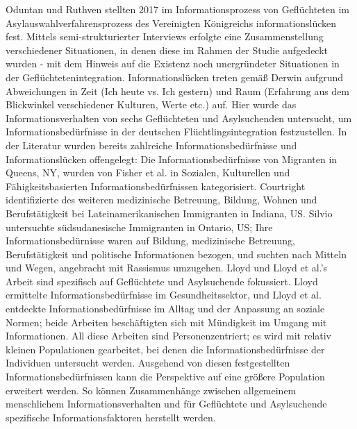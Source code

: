 Oduntan und Ruthven stellten 2017 im Informationsprozess von Gefl\"uchteten im Asylauswahlverfahrensprozess des Vereinigten K\"onigreichs informationsl\"ucken fest. \cite{oduntan2017investigating}
Mittels semi-strukturierter Interviews erfolgte eine Zusammenstellung verschiedener Situationen, in denen diese im Rahmen der Studie aufgedeckt wurden - mit dem Hinweis auf die Existenz noch unergr\"undeter Situationen in der Gefl\"uchtetenintegration.\newline
Informationsl\"ucken treten gem\"a\ss{} Derwin aufgrund Abweichungen in Zeit (Ich heute vs. Ich gestern) und Raum (Erfahrung aus dem Blickwinkel verschiedener Kulturen, Werte etc.) auf.\cite{dervin2003sense}\newline
Hier wurde das Informationsverhalten von sechs Gefl\"uchteten und Asylsuchenden untersucht, um Informationsbed\"urfnisse in der deutschen Fl\"uchtlingsintegration festzustellen.\newline
In der Literatur wurden bereits zahlreiche Informationsbedürfnisse und Informationslücken offengelegt:\newline
Die Informationsbedürfnisse von Migranten in Queens, NY, wurden von Fisher et al. in Sozialen, Kulturellen und Fähigkeitsbasierten Informationsbedürfnissen kategorisiert. \cite{fisher2004information}
Courtright identifizierte des weiteren medizinische Betreuung, Bildung, Wohnen und Berufstätigkeit bei Lateinamerikanischen Immigranten in Indiana, US. \cite{courtright2005health}
Silvio untersuchte südsudanesische Immigranten in Ontario, US; Ihre Informationsbedürnisse waren auf Bildung, medizinische Betreuung, Berufstätigkeit und politische Informationen bezogen, und suchten nach Mitteln und Wegen, angebracht mit Rassismus umzugehen.\cite{hakim2006information}\newline
Lloyd\cite{lloyd2014building} und Lloyd et al.\cite{lloyd2013connecting}'s Arbeit sind spezifisch auf Geflüchtete und Asylsuchende fokussiert. Lloyd ermittelte Informationsbedürfnisse im Gesundheitssektor, und Lloyd et al. entdeckte Informationsbedürfnisse im Alltag und der Anpassung an soziale Normen; beide Arbeiten beschäftigten sich mit Mündigkeit im Umgang mit Informationen.\newline
All diese Arbeiten sind Personenzentriert; es wird mit relativ kleinen Populationen gearbeitet, bei denen die Informationsbedürfnisse der Individuen untersucht werden. Ausgehend von diesen festgestellten Informationsbedürfnissen kann die Perspektive auf eine größere Population erweitert werden. So können Zusammenhänge zwischen allgemeinem menschlichem Informationsverhalten und für Geflüchtete und Asylsuchende spezifische Informationsfaktoren herstellt werden.\cite{oduntan2017investigating}\newline

